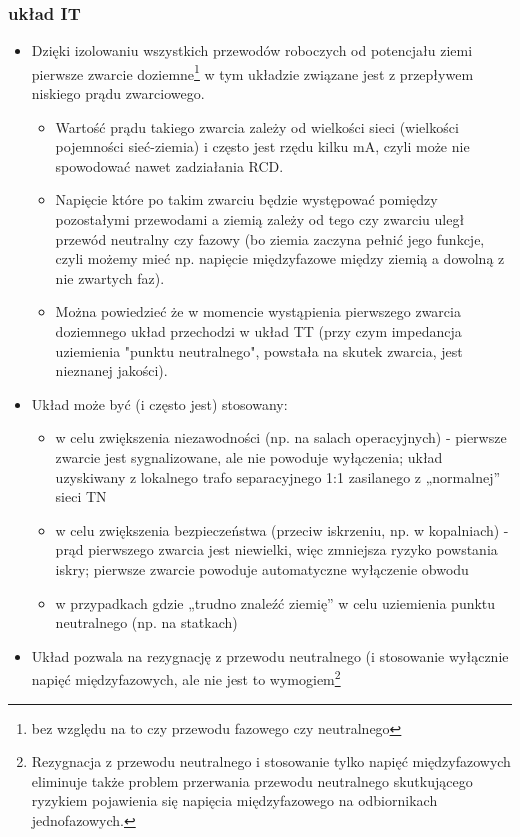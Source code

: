 \subsubsection{układ IT}
\begin{itemize}
	\item Dzięki izolowaniu wszystkich przewodów roboczych od potencjału ziemi pierwsze zwarcie doziemne\footnote{bez względu na to czy przewodu fazowego czy neutralnego} w tym układzie związane jest z przepływem niskiego prądu zwarciowego.
	\begin{itemize}
		\item Wartość prądu takiego zwarcia zależy od wielkości sieci (wielkości pojemności sieć-ziemia) i często jest rzędu kilku mA, czyli może nie spowodować nawet zadziałania RCD.
		\item Napięcie które po takim zwarciu będzie występować pomiędzy pozostałymi przewodami a ziemią zależy od tego czy zwarciu uległ przewód neutralny czy fazowy
			(bo ziemia zaczyna pełnić jego funkcje, czyli możemy mieć np. napięcie międzyfazowe między ziemią a dowolną z nie zwartych faz).
		\item Można powiedzieć że w momencie wystąpienia pierwszego zwarcia doziemnego układ przechodzi w układ TT (przy czym impedancja uziemienia "punktu neutralnego", powstała na skutek zwarcia, jest nieznanej jakości).
	\end{itemize}
	\item Układ może być (i często jest) stosowany:
	\begin{itemize}
		\item w celu zwiększenia niezawodności (np. na salach operacyjnych) - pierwsze zwarcie jest sygnalizowane, ale nie powoduje wyłączenia; układ uzyskiwany z lokalnego trafo separacyjnego 1:1 zasilanego z „normalnej” sieci TN
		\item w celu zwiększenia bezpieczeństwa (przeciw iskrzeniu, np. w kopalniach) - prąd pierwszego zwarcia jest niewielki, więc zmniejsza ryzyko powstania iskry; pierwsze zwarcie powoduje automatyczne wyłączenie obwodu
		\item w przypadkach gdzie „trudno znaleźć ziemię” w celu uziemienia punktu neutralnego (np. na statkach)
	\end{itemize}
	\item Układ pozwala na rezygnację z przewodu neutralnego (i stosowanie wyłącznie napięć międzyfazowych, ale nie jest to wymogiem\footnote{
			Rezygnacja z przewodu neutralnego i stosowanie tylko napięć międzyfazowych eliminuje także problem przerwania przewodu neutralnego skutkującego ryzykiem pojawienia się napięcia międzyfazowego na odbiornikach jednofazowych.
}
\end{itemize}
